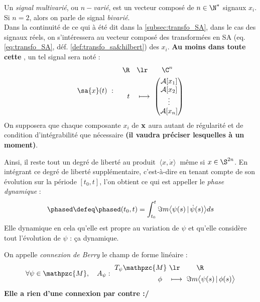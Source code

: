 \begin{definition}\label{def:signal_multivar}
	Un \emph{signal multivarié}, ou \emph{$n-$varié}, est un vecteur composé de $n\in\N^*$ signaux $x_i$. Si $n=2$, alors on parle de signal \emph{bivarié}.
	\\
	Dans la continuité de ce qui à été dit dans la \cref{subsec:transfo_SA}, dans le cas des signaux réels, on s'intéressera au vecteur composé des transformées en SA (eq. \ref{eq:transfo_SA}, déf. \ref{def:transfo_sa&hilbert}) des $x_i$.
	\textbf{Au moins dans toute cette }, un tel signal sera noté :
	\[\sa{x}(t)\ :\quad \begin{aligned} 
		\R\quad &\lr\qquad \C^n \\t\quad &\longmapsto\ \begin{pmatrix} \mathcal{A}[x_1] \\ 
			\mathcal{A}[x_2] \\ \vdots \\ \mathcal{A}[x_n] \end{pmatrix}
	\end{aligned} \]
	On supposera que chaque composante $x_i$ de $\bf{x}$ aura autant de régularité et de condition d'intégrabilité que nécessaire \textbf{(il vaudra préciser lesquelles à un moment)}.
\end{definition}

\begin{definition}\label{def:phase_dyn}
	Ainsi, il reste tout un degré de liberté au produit $\ \langle x, \dot{x} \rangle\ $ même si $x\in\S^{2n}$. En intégrant ce degré de liberté supplémentaire, c'est-à-dire en tenant compte de son évolution sur la période $[t_0,t]$, l'on obtient ce qui est appeller le \emph{phase dynamique} :
	\[\phased \defeq \phased(t_0,t) = \int_{t_0}^t \Im m \big\langle \psi(s) \, |\, \dot{\psi}(s) \big\rangle ds\]
	Elle dynamique en cela qu'elle est propre au variation de $\psi$ et qu'elle considère tout l'évolution de $\psi$ : ça dynamique.
\end{definition}


\begin{definition}\label{def:berry_connx}
	On appelle \emph{connexion de Berry} le champ de forme linéaire :
	\begin{equation}\label{eq:berry_connx}
		\forall \psi\in\mathpzc{M},\quad A_\psi :\ \begin{aligned} T_\psi\mathpzc{M}\ &\lr\qquad\ \R \\ \phi\quad &\longmapsto\ \Im m \big\langle \psi(s) \, |\, \phi(s) \big\rangle
		\end{aligned}
	\end{equation}
	\textbf{Elle a rien d'une connexion par contre :/}
\end{definition}



